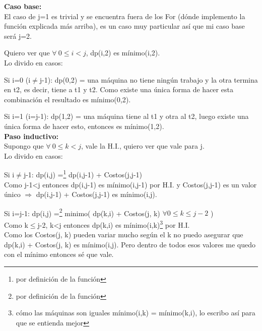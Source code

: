 \textbf{Caso base:}\\
El caso de j=1 es trivial y se encuentra fuera de los For (dónde implemento la función explicada más arriba), es un caso muy particular así que mi caso base será j=2.

Quiero ver que $\forall\ 0\leq i<j$, dp(i,2) es mínimo(i,2).\\
Lo divido en casos:

Si i=0 (i$\neq$j-1): dp(0,2) = una máquina no tiene ningún trabajo y la otra termina en t2, es decir, tiene a t1 y t2. Como existe una única forma de hacer esta combinación el resultado es mínimo(0,2).

Si i=1 (i=j-1): dp(1,2) = una máquina tiene al t1 y otra al t2, luego existe una única forma de hacer esto, entonces es mínimo(1,2).\\

\textbf{Paso inductivo:}\\
Supongo que $\forall\ 0\leq k<j$, vale la H.I., quiero ver que vale para j.\\
Lo divido en casos:

Si i$\neq$j-1: dp(i,j) =\footnote{por definición de la función} dp(i,j-1) + Costos(j,j-1)\\
Como j-1<j entonces dp(i,j-1) es mínimo(i,j-1) por H.I. y Costos(j,j-1) es un valor único $\Rightarrow$ dp(i,j-1) + Costos(j,j-1) es mínimo(i,j).

Si i=j-1: dp(i,j) =\footnote{por definición de la función} minimo( dp(k,i) + Costos(j, k) $\forall 0\leq k\leq j-2$ )\\
Como k$\leq$j-2, k<j entonces dp(k,i) es mínimo(i,k)\footnote{cómo las máquinas son iguales mínimo(i,k) = mínimo(k,i), lo escribo así para que se entienda mejor} por H.I.\\
Como los Costos(j, k) pueden variar mucho según el k no puedo asegurar que dp(k,i) + Costos(j, k) es mínimo(i,j). Pero dentro de todos esos valores me quedo con el mínimo entonces sé que vale.\\